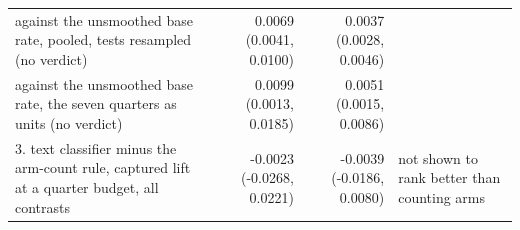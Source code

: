 \begin{tabular}{p{5.6cm}rrp{2.4cm}}
\quad against the unsmoothed base rate, pooled, tests resampled (no verdict) & 0.0069 (0.0041, 0.0100) & 0.0037 (0.0028, 0.0046) &  \\
\quad against the unsmoothed base rate, the seven quarters as units (no verdict) & 0.0099 (0.0013, 0.0185) & 0.0051 (0.0015, 0.0086) &  \\
\midrule
3. text classifier minus the arm-count rule, captured lift at a quarter budget, all contrasts & -0.0023 (-0.0268, 0.0221) & -0.0039 (-0.0186, 0.0080) & not shown to rank better than counting arms \\
\bottomrule
\end{tabular}
